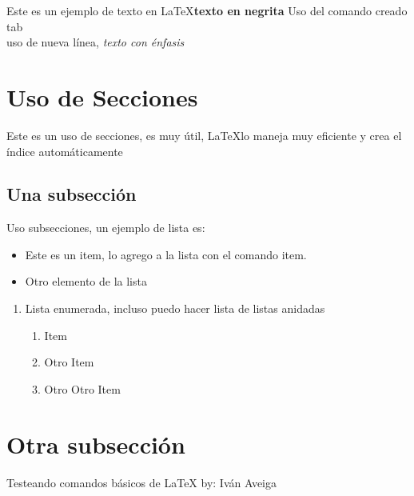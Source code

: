 \documentclass[a4paper,11pt]{article} %
\newcommand{\tab}{\hspace*{5em}} %
\begin{document}
\tableofcontents %
\newpage  %
Este es un ejemplo de texto en \LaTeX \textbf{texto en negrita} \tab Uso del comando creado tab \\ uso 
de nueva línea, \emph{texto con énfasis}
\section{Uso de Secciones}
Este es un uso de secciones, es muy útil, \LaTeX lo maneja muy eficiente y crea el índice automáticamente
	\subsection{Una subsección}
	Uso subsecciones, un ejemplo de lista es:
	\begin{itemize} %
		\item Este es un item, lo agrego a la lista con el comando item.
		\item Otro elemento de la lista
	\end{itemize}
	
	\begin{enumerate} %
	\item Lista enumerada, incluso puedo hacer lista de listas anidadas
		\begin{enumerate}
			\item Item 
			\item Otro Item
			\item Otro Otro Item
		\end{enumerate}
	\end{enumerate}
\section{Otra subsección}
Testeando comandos básicos de  \LaTeX
	by: Iván Aveiga
\end{document}
